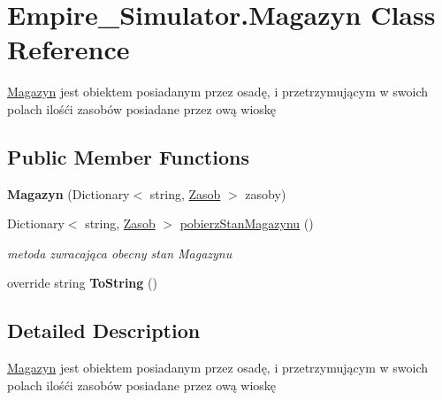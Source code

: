 \hypertarget{class_empire___simulator_1_1_magazyn}{\section{Empire\+\_\+\+Simulator.\+Magazyn Class Reference}
\label{class_empire___simulator_1_1_magazyn}
}


\hyperlink{class_empire___simulator_1_1_magazyn}{Magazyn} jest obiektem posiadanym przez osadę, i przetrzymującym w swoich polach ilośći zasobów posiadane przez ową wioskę  


\subsection*{Public Member Functions}
\begin{DoxyCompactItemize}
\item 
\hypertarget{class_empire___simulator_1_1_magazyn_aa4e695b9b8d8bda4fa76e4d628688335}{{\bfseries Magazyn} (Dictionary$<$ string, \hyperlink{class_empire___simulator_1_1_zasob}{Zasob} $>$ zasoby)}\label{class_empire___simulator_1_1_magazyn_aa4e695b9b8d8bda4fa76e4d628688335}

\item 
Dictionary$<$ string, \hyperlink{class_empire___simulator_1_1_zasob}{Zasob} $>$ \hyperlink{class_empire___simulator_1_1_magazyn_aa9eb4e63d4b3d495af6d9b2f40ea2cd3}{pobierz\+Stan\+Magazynu} ()
\begin{DoxyCompactList}\small\item\em metoda zwracająca obecny stan Magazynu \end{DoxyCompactList}\item 
\hypertarget{class_empire___simulator_1_1_magazyn_a2e194935669e0531b6b7e1e746d0f828}{override string {\bfseries To\+String} ()}\label{class_empire___simulator_1_1_magazyn_a2e194935669e0531b6b7e1e746d0f828}

\end{DoxyCompactItemize}


\subsection{Detailed Description}
\hyperlink{class_empire___simulator_1_1_magazyn}{Magazyn} jest obiektem posiadanym przez osadę, i przetrzymującym w swoich polach ilośći zasobów posiadane przez ową wioskę 



